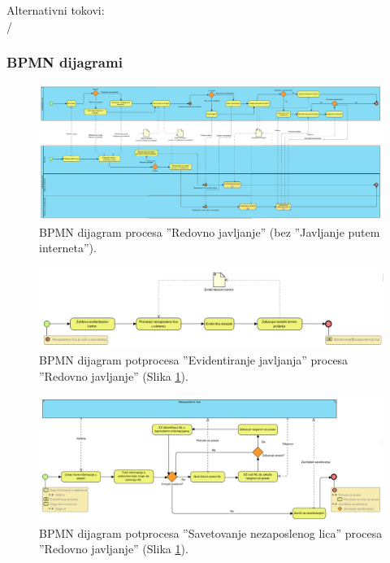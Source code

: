 \noindent Alternativni tokovi: 
\\/

\begin{mylandscape}
	\subsubsection{BPMN dijagrami}
	
	\begin{figure}[H]
		\centering
		\includegraphics[width=0.8\paperwidth]{dijagrami/bpmn-dijagrami/redovno-javljanje-bpmn.png}
		\caption{BPMN dijagram procesa ''Redovno javljanje'' (bez ''Javljanje putem interneta'').}
		\label{bpmnd: redovno javljanje}
	\end{figure}

	\newpage
	
	\begin{figure}[H]
		\centering
		\includegraphics[width=0.8\paperwidth]{dijagrami/bpmn-dijagrami/evidentiranje-javljanja.png}
		\caption{BPMN dijagram potprocesa ''Evidentiranje javljanja'' procesa ''Redovno javljanje'' (Slika \ref{bpmnd: redovno javljanje}).}
	\end{figure}

	\newpage
	
	\begin{figure}[H]
		\centering
		\includegraphics[width=0.8\paperwidth]{dijagrami/bpmn-dijagrami/savetovanje-nezaposlenog-lica.png}
		\caption{BPMN dijagram potprocesa ''Savetovanje nezaposlenog lica'' procesa ''Redovno javljanje'' (Slika \ref{bpmnd: redovno javljanje}).}
	\end{figure}
\end{mylandscape}

